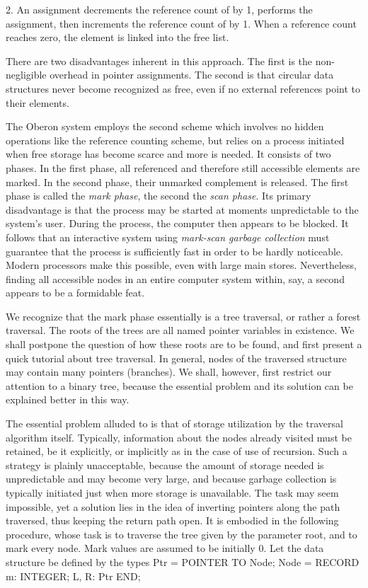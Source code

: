 2. An assignment  decrements the reference count of  by 1, performs the assignment, then increments the reference count of  by 1. When a reference count reaches zero, the element is linked into the free list.

There are two disadvantages inherent in this approach. The first is the non-negligible overhead in pointer assignments. The second is that circular data structures never become recognized as free, even if no external references point to their elements.

The Oberon system employs the second scheme which involves no hidden operations like the reference counting scheme, but relies on a process initiated when free storage has become scarce and more is needed. It consists of two phases. In the first phase, all referenced and therefore still accessible elements are marked. In the second phase, their unmarked complement is released. The first phase is called the \emph{mark phase}, the second the \emph{scan phase}. Its primary disadvantage is that the process may be started at moments unpredictable to the system's user. During the process, the computer then appears to be blocked. It follows that an interactive system using \emph{mark-scan garbage collection} must guarantee that the process is sufficiently fast in order to be hardly noticeable. Modern processors make this possible, even with large main stores. Nevertheless, finding all accessible nodes in an entire computer system within, say, a second appears to be a formidable feat.

We recognize that the mark phase essentially is a tree traversal, or rather a forest traversal. The roots of the trees are all named pointer variables in existence. We shall postpone the question of how these roots are to be found, and first present a quick tutorial about tree traversal. In general, nodes of the traversed structure may contain many pointers (branches). We shall, however, first restrict our attention to a binary tree, because the essential problem and its solution can be explained better in this way.

The essential problem alluded to is that of storage utilization by the traversal algorithm itself. Typically, information about the nodes already visited must be retained, be it explicitly, or implicitly as in the case of use of recursion. Such a strategy is plainly unacceptable, because the amount of storage needed is unpredictable and may become very large, and because garbage collection is typically initiated just when more storage is unavailable. The task may seem impossible, yet a solution lies in the idea of inverting pointers along the path traversed, thus keeping the return path open. It is embodied in the following procedure, whose task is to traverse the tree given by the parameter root, and to mark every node. Mark values are assumed to be initially 0. Let the data structure be defined by the types
\begintt
Ptr = POINTER TO Node;
Node = RECORD m: INTEGER; L, R: Ptr END;
\endtt

